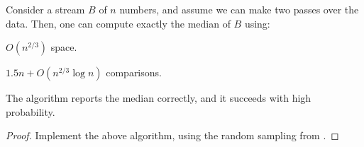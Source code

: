 

\begin{lemma}
    Consider a stream $B$ of $n$ numbers, and assume we can make two
    passes over the data. Then, one can compute exactly the median of
    $B$ using:
    \begin{compactenumI}
        \item $O(n^{2/3})$ space.
        \item $1.5n + O(n^{2/3} \log n)$ comparisons.
    \end{compactenumI}
    The algorithm reports the median correctly, and it succeeds with
    high probability.
\end{lemma}
\begin{proof}
    Implement the above algorithm, using the random sampling from
    .
\end{proof}



